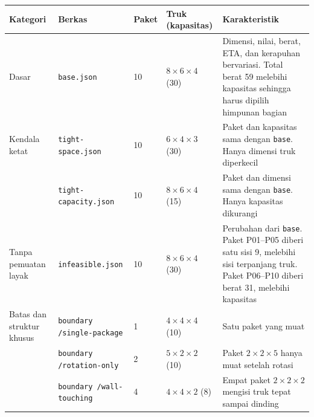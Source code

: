 \begin{table}[H]
    \centering
    \small
    \begin{tabular}{@{}p{2.6cm}p{3.3cm}p{1.0cm}p{2.3cm}p{5.4cm}@{}}
        \toprule
        Kategori                  & Berkas                               & Paket & Truk (kapasitas)          & Karakteristik                                                                                                                                                         \\
        \midrule
        Dasar                     & \texttt{base.json}                   & 10    & $8\times6\times4$ (30)    & Dimensi, nilai, berat, ETA, dan kerapuhan bervariasi. Total berat 59 melebihi kapasitas sehingga harus dipilih himpunan bagian                                        \\
        \midrule
        Kendala ketat             & \texttt{tight-space.json}            & 10    & $6\times4\times3$ (30)    & Paket dan kapasitas sama dengan \texttt{base}. Hanya dimensi truk diperkecil                                                                                          \\
                                  & \texttt{tight-capacity.json}         & 10    & $8\times6\times4$ (15)    & Paket dan dimensi sama dengan \texttt{base}. Hanya kapasitas dikurangi                                                                                                \\
        \midrule
        Tanpa pemuatan layak      & \texttt{infeasible.json}             & 10    & $8\times6\times4$ (30)    & Perubahan dari \texttt{base}. Paket P01--P05 diberi satu sisi 9, melebihi sisi terpanjang truk. Paket P06--P10 diberi berat 31, melebihi kapasitas                    \\
        \midrule
        Batas dan struktur khusus & \texttt{boundary /single-package}    & 1     & $4\times4\times4$ (10)    & Satu paket yang muat                                                                                                                                                  \\
                                  & \texttt{boundary /rotation-only}     & 2     & $5\times2\times2$ (10)    & Paket $2\times2\times5$ hanya muat setelah rotasi                                                                                                                     \\
                                  & \texttt{boundary /wall-touching}     & 4     & $4\times4\times2$ (8)     & Empat paket $2\times2\times2$ mengisi truk tepat sampai dinding                                                                                                       \\

\end{tabular}
\end{table}
